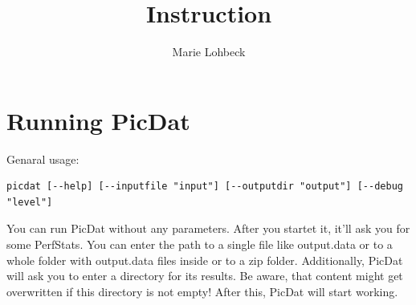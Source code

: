 \documentclass[8pt]{extarticle}
\title{Instruction}
\author{Marie Lohbeck}
\begin{document}
\section*{Running PicDat}
Genaral usage: 
\begin{lstlisting}
picdat [--help] [--inputfile "input"] [--outputdir "output"] [--debug "level"]
\end{lstlisting}

You can run PicDat without any parameters. After you startet it, it'll ask you for some PerfStats. You can enter the path to a single file like output.data or to a whole folder with output.data files inside or to a zip folder. Additionally, PicDat will ask you to enter a directory for its results. Be aware, that content might get overwritten if this directory is not empty! After this, PicDat will start working. 
\end{document}
